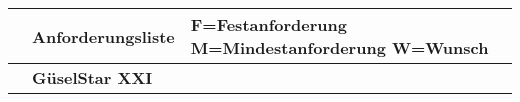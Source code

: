 \begin{tabular}{|p{2cm}|p{7.3cm}|p{4.5cm}|}\hline
     &   \huge{\textbf{Anforderungsliste}} & F=Festanforderung M=Mindestanforderung W=Wunsch \\\hline
     &   \textbf{GüselStar XXI}            &  \\\hline
\end{tabular}\\[0.5cm]